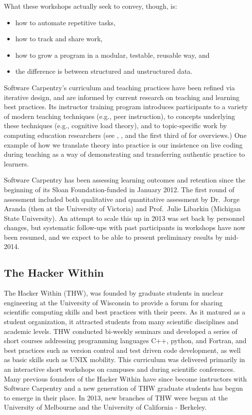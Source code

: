 \documentclass[11pt]{article}
\begin{document}
What these workshops actually seek to convey, though, is:

\begin{itemize}
\item
  how to automate repetitive tasks,
\item
  how to track and share work,
\item
  how to grow a program in a modular, testable, reusable way, and
\item
  the difference is between structured and unstructured data.
\end{itemize}

Software Carpentry's curriculum and teaching practices have been
refined via iterative design, and are informed by current research on
teaching and learning best practices.  Its instructor training program
introduces participants to a variety of modern teaching techniques
(e.g., peer instruction), to concepts underlying these techniques
(e.g., cognitive load theory), and to topic-specific work by computing
education researchers (see \cite{guzdial2010}, \cite{hazzan2011}, and
the first third of \cite{sorva2012} for overviews.)  One example of
how we translate theory into practice is our insistence on live coding
during teaching as a way of demonstrating and transferring authentic
practice to learners.

Software Carpentry has been assessing learning outcomes and retention
since the beginning of its Sloan Foundation-funded in January 2012.
The first round of assessment included both qualitative and
quantitative assessment by Dr.\ Jorge Aranda (then at the University
of Victoria) and Prof.\ Julie Libarkin (Michigan State University).
An attempt to scale this up in 2013 was set back by personnel changes,
but systematic follow-ups with past participants in workshops have now
been resumed, and we expect to be able to present preliminary results
by mid-2014.

\subsection{The Hacker Within}

The Hacker Within (THW)\cite{huff2011}, was founded by graduate students in 
nuclear engineering at the University of Wisconsin to provide a forum for 
sharing scientific computing skills and best practices with their peers. As it 
matured as a student organization, it attracted students from many scientific 
disciplines and academic levels. THW conducted bi-weekly seminars and developed 
a series of short courses addressing programming languages C++, python, and 
Fortran, and best practices such as version control and test driven code 
development, as well as basic skills such as UNIX mobility. This curriculum was 
delivered primarily in an interactive short workshops on campuses and during 
scientific conferences. Many previous founders of the Hacker Within have since 
become instructors with Software Carpentry and a new generation of THW graduate 
students has begun to emerge in their place. In 2013, new branches of THW were 
begun at the University of Melbourne and the University of California - 
Berkeley.  
\end{document}
